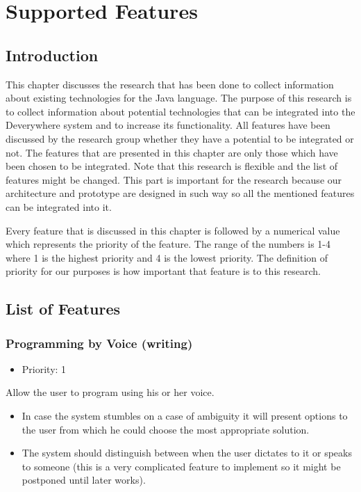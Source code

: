 \chapter{Supported Features} \label{chapter: Supported Features}
\section{Introduction}
This chapter discusses the research that has been done to collect information about existing technologies for the Java language. The purpose of this research is to collect information about potential technologies that can be integrated into the Deverywhere system and to increase its functionality. All features have been discussed by the research group whether they have a potential to be integrated or not. The features that are presented in this chapter are only those which have been chosen to be integrated. Note that this research is flexible and the list of features might be changed. This part is important for the research because our architecture and prototype are designed in such way so all the mentioned features can be integrated into it.

Every feature that is discussed in this chapter is followed by a numerical value which represents the priority of the feature. The range of the numbers is 1-4 where 1 is the highest priority and 4 is the lowest priority. The definition of priority for our purposes is how important that feature is to this research.

\section{List of Features}
\subsection{Programming by Voice (writing)}
\begin{itemize}
	\item Priority: 1
\end{itemize}
Allow the user to program using his or her voice.
\begin{itemize}
	\item In case the system stumbles on a case of ambiguity it will present options to the user from which he could choose the most appropriate solution.
	\item The system should distinguish between when the user dictates to it or speaks to someone (this is a very complicated feature to implement so it might be postponed until  later works).
\end{itemize}
